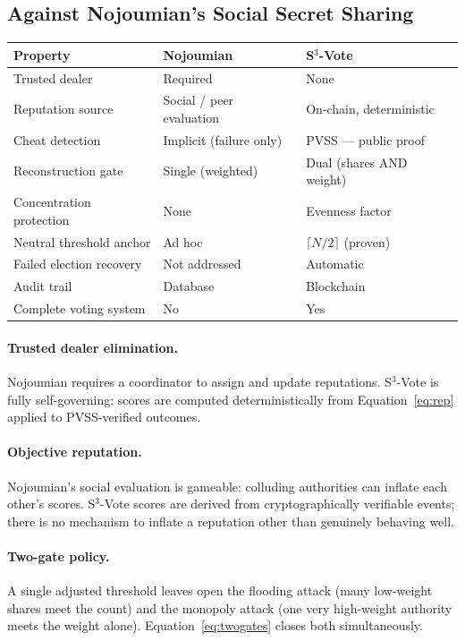\documentclass[12pt,a4paper]{article}
\theoremstyle{definition}
\theoremstyle{remark}
\begin{document}
\subsection{Against Nojoumian's Social Secret Sharing}

\begin{center}
\begin{tabular}{p{4cm}p{4.5cm}p{4.5cm}}
\toprule
\textbf{Property} & \textbf{Nojoumian} & \textbf{S$^3$-Vote} \\
\midrule
Trusted dealer & Required & None \\
Reputation source & Social / peer evaluation & On-chain, deterministic \\
Cheat detection & Implicit (failure only) & PVSS — public proof \\
Reconstruction gate & Single (weighted) & Dual (shares AND weight) \\
Concentration protection & None & Evenness factor \\
Neutral threshold anchor & Ad hoc & $\lceil N/2 \rceil$ (proven) \\
Failed election recovery & Not addressed & Automatic \\
Audit trail & Database & Blockchain \\
Complete voting system & No & Yes \\
\bottomrule
\end{tabular}
\end{center}

\paragraph{Trusted dealer elimination.}
Nojoumian requires a coordinator to assign and update reputations.
S$^3$-Vote is fully self-governing: scores are computed deterministically
from Equation~\eqref{eq:rep} applied to PVSS-verified outcomes.

\paragraph{Objective reputation.}
Nojoumian's social evaluation is gameable: colluding authorities can
inflate each other's scores. S$^3$-Vote scores are derived from
cryptographically verifiable events; there is no mechanism to inflate
a reputation other than genuinely behaving well.

\paragraph{Two-gate policy.}
A single adjusted threshold leaves open the flooding attack (many
low-weight shares meet the count) and the monopoly attack (one very
high-weight authority meets the weight alone).
Equation~\eqref{eq:twogates} closes both simultaneously.
\end{document}
